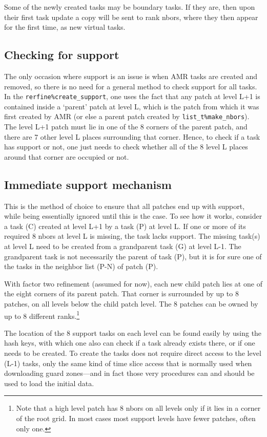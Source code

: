 \documentclass[paper=a4,fontsize=11pt]{scrartcl}
\numberwithin{equation}{section}		%
\numberwithin{figure}{section}			%
\numberwithin{table}{section}				%
\newcommand{\codecolor}{\color{Blue}}
\newcommand{\Code}[1]{{\codecolor\texttt{#1}}}
\begin{document}
Some of the newly created tasks may be boundary tasks.  If they are, then upon their first task update a copy will be sent to rank nbors, where they then appear for the first time, as new virtual tasks.

\subsection{Checking for support}
The only occasion where support is an issue is when AMR tasks are created and removed, so there is no need for a general method to check support for all tasks.  In the \verb|rerfine%create_support|, one uses the fact that any patch at level L+1 is contained inside a `parent' patch at level L, which is the patch from which it was first created by AMR (or else a parent patch created by \Code{list\_t\%make\_nbors}).  The level L+1 patch must lie in one of the 8 corners of the parent patch, and there are 7 other level L places surrounding that corner.  Hence, to check if a task has support or not, one just needs to check whether all of the 8 level L places around that corner are occupied or not.

\subsection{Immediate support mechanism}
This is the method of choice to ensure that all patches end up with support, while being essentially ignored until this is the case.  To see how it works, consider a task (C) created at level L+1 by a task (P) at level L.  If one or more of its required 8 nbors at level L is missing, the task lacks support.   The missing task(s) at level L need to be created from a grandparent task (G) at level L-1.  The grandparent task is not necessarily the parent of task (P), but it is for sure one of the tasks in the neighbor list (P-N) of patch (P).

With factor two refinement (assumed for now), each new child patch lies at one of the eight corners of its parent patch.  That corner is surrounded by up to 8 patches, on all levels below the child patch level. The 8 patches can be owned by up to 8 different ranks.\footnote{Note that a high level patch has 8 nbors on all levels only if it lies in a corner of the root grid.  In most cases most support levels have fewer patches, often only one.}

The location of the 8 support tasks on each level can be found easily by using the hash keys, with which one also can check if a task already exists there, or if one needs to be created.  To create the tasks does not require direct access to the level (L-1) tasks, only the same kind of time slice access that is normally used when downloading guard zones---and in fact those very procedures can and should be used to load the initial data.
\end{document}
